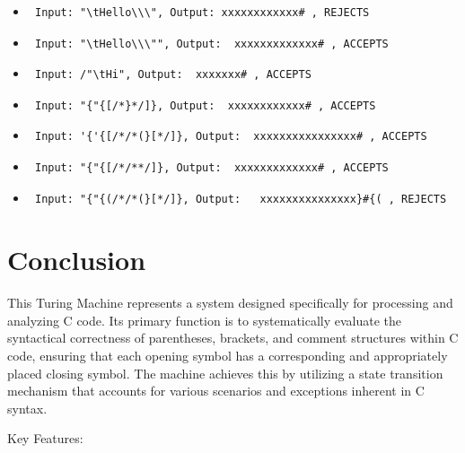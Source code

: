 \documentclass{article}
\begin{document}
{{\begin{itemize}
\begin{verbatim}
        whether it makes sense for C to divide "\"\0" by '\r' \end{verbatim} 
    \item \begin{verbatim} Input: "\tHello\\\", Output: xxxxxxxxxxxx# , REJECTS \end{verbatim}
    \item \begin{verbatim} Input: "\tHello\\\"", Output:  xxxxxxxxxxxxx# , ACCEPTS \end{verbatim}
    \item \begin{verbatim} Input: /"\tHi", Output:  xxxxxxx# , ACCEPTS \end{verbatim}
    \item \begin{verbatim} Input: "{"{[/*}*/]}, Output:  xxxxxxxxxxxx# , ACCEPTS \end{verbatim}
    \item \begin{verbatim} Input: '{'{[/*/*(}[*/]}, Output:  xxxxxxxxxxxxxxxx# , ACCEPTS \end{verbatim} 
    \item \begin{verbatim} Input: "{"{[/*/**/]}, Output:  xxxxxxxxxxxxx# , ACCEPTS \end{verbatim}
    \item \begin{verbatim} Input: "{"{(/*/*(}[*/]}, Output:   xxxxxxxxxxxxxxx}#{( , REJECTS \end{verbatim}

\end{itemize}

\section{Conclusion}
This Turing Machine represents a system designed specifically for processing and analyzing C code. Its primary function is to systematically evaluate 
the syntactical correctness of parentheses, brackets, and comment structures within C code, ensuring that each opening symbol has a corresponding and 
appropriately placed closing symbol. The machine achieves this by utilizing a state transition mechanism that accounts for various scenarios and 
exceptions inherent in C syntax.

Key Features:

}}
\end{document}
